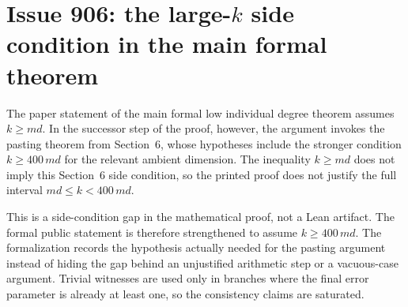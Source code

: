 \section*{Issue 906: the large-$k$ side condition in the main formal theorem}

The paper statement of the main formal low individual degree theorem assumes
$k \ge md$.  In the successor step of the proof, however, the argument invokes
the pasting theorem from Section~6, whose hypotheses include the stronger
condition $k \ge 400\,md$ for the relevant ambient dimension.  The inequality
$k \ge md$ does not imply this Section~6 side condition, so the printed proof
does not justify the full interval $md \le k < 400\,md$.

This is a side-condition gap in the mathematical proof, not a Lean artifact.
The formal public statement is therefore strengthened to assume
$k \ge 400\,md$.  The formalization records the hypothesis actually needed for
the pasting argument instead of hiding the gap behind an unjustified arithmetic
step or a vacuous-case argument.  Trivial witnesses are used only in branches
where the final error parameter is already at least one, so the consistency
claims are saturated.
